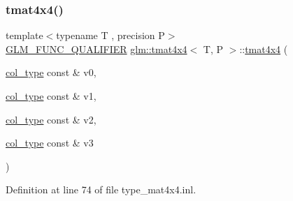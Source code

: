 \subsubsection{\texorpdfstring{tmat4x4()}{tmat4x4()}\hspace{0.1cm}{\footnotesize\ttfamily [7/22]}}
{\footnotesize\ttfamily template$<$typename T , precision P$>$ \\
\mbox{\hyperlink{setup_8hpp_a33fdea6f91c5f834105f7415e2a64407}{G\+L\+M\+\_\+\+F\+U\+N\+C\+\_\+\+Q\+U\+A\+L\+I\+F\+I\+ER}} \mbox{\hyperlink{structglm_1_1tmat4x4}{glm\+::tmat4x4}}$<$ T, P $>$\+::\mbox{\hyperlink{structglm_1_1tmat4x4}{tmat4x4}} (\begin{DoxyParamCaption}\item[{\mbox{\hyperlink{structglm_1_1tmat4x4_ac879ae9669b754551245231ee992a1ea}{col\+\_\+type}} const \&}]{v0,  }\item[{\mbox{\hyperlink{structglm_1_1tmat4x4_ac879ae9669b754551245231ee992a1ea}{col\+\_\+type}} const \&}]{v1,  }\item[{\mbox{\hyperlink{structglm_1_1tmat4x4_ac879ae9669b754551245231ee992a1ea}{col\+\_\+type}} const \&}]{v2,  }\item[{\mbox{\hyperlink{structglm_1_1tmat4x4_ac879ae9669b754551245231ee992a1ea}{col\+\_\+type}} const \&}]{v3 }\end{DoxyParamCaption})}



Definition at line 74 of file type\+\_\+mat4x4.\+inl.

\mbox{\label{structglm_1_1tmat4x4_a21e75b577b5e9bf7a872de8820a383b8}} 
